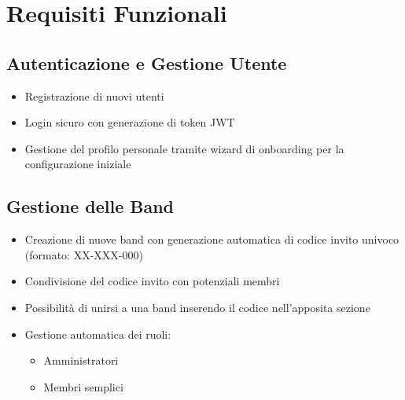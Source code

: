 \documentclass{report}
\begin{document}
\section{Requisiti Funzionali}

\subsection{Autenticazione e Gestione Utente}
\begin{itemize}
    \item Registrazione di nuovi utenti
    \item Login sicuro con generazione di token JWT
    \item Gestione del profilo personale tramite wizard di onboarding per la configurazione iniziale
\end{itemize}

\subsection{Gestione delle Band}
\begin{itemize}
    \item Creazione di nuove band con generazione automatica di codice invito univoco (formato: XX-XXX-000)
    \item Condivisione del codice invito con potenziali membri
    \item Possibilità di unirsi a una band inserendo il codice nell'apposita sezione
    \item Gestione automatica dei ruoli:
    \begin{itemize}
        \item Amministratori
        \item Membri semplici
    \end{itemize}
\end{itemize}
\end{document}
